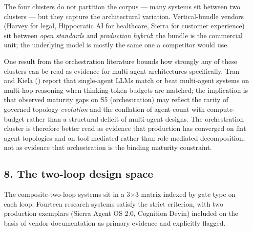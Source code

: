 \documentclass[
]{article}
\begin{document}
The four clusters do not partition the corpus --- many systems sit
between two clusters --- but they capture the architectural variation.
Vertical-bundle vendors (Harvey for legal, Hippocratic AI for
healthcare, Sierra for customer experience) sit between \emph{open
standards} and \emph{production hybrid}: the bundle is the commercial
unit; the underlying model is mostly the same one a competitor would
use.

One result from the orchestration literature bounds how strongly any of
these clusters can be read as evidence for multi-agent architectures
specifically. Tran and Kiela ()
report that single-agent LLMs match or beat multi-agent systems on
multi-hop reasoning when thinking-token budgets are matched; the
implication is that observed maturity gaps on S5 (orchestration) may
reflect the rarity of governed topology \emph{evolution} and the
conflation of agent-count with compute-budget rather than a structural
deficit of multi-agent designs. The orchestration cluster is therefore
better read as evidence that production has converged on flat agent
topologies and on tool-mediated rather than role-mediated decomposition,
not as evidence that orchestration is the binding maturity constraint.

\subsection{8. The two-loop design
space}\label{the-two-loop-design-space}

The composite-two-loop systems sit in a 3×3 matrix indexed by gate type
on each loop. Fourteen research systems satisfy the strict criterion,
with two production exemplars (Sierra Agent OS 2.0, Cognition Devin)
included on the basis of vendor documentation as primary evidence and
explicitly flagged.
\end{document}
